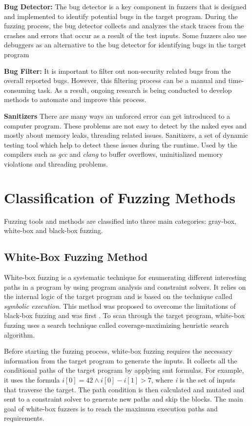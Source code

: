 \textbf{Bug Detector:} The bug detector is a key component in fuzzers that is designed
and implemented to identify potential bugs in the target program.
During the fuzzing process, the bug detector collects and analyzes the stack
traces from the crashes and errors that occur as a result of the test inputs.
Some fuzzers also use debuggers as an alternative to the bug detector for
identifying bugs in the target program

\textbf{Bug Filter:} It is important to filter out non-security related bugs
from the overall reported bugs. However, this filtering process can be a manual and
time-consuming task. As a result, ongoing research is being conducted to develop
methods to automate and improve this process.

\textbf{Sanitizers}
There are many ways an unforced error can get introduced to a computer program. These problems are not
easy to detect by the naked eyes and mostly about memory leaks, threading related issues. Sanitizers, a set
of dynamic testing tool which help to detect these issues during the runtime. Used by the
compilers such as \textit{gcc} and \textit{clang} to buffer overflows, uninitialized memory violations
and threading problems.

\section{Classification of Fuzzing Methods}\label{sec:fuzzing_methods}
Fuzzing tools and methods are classified into three main categories: gray-box, white-box and
black-box fuzzing.

\subsection{White-Box Fuzzing Method}

White-box fuzzing is a systematic technique for enumerating different interesting paths in a
program by using program analysis and constraint solvers. It relies on the internal logic
of the target program and is based on the technique called \textit{symbolic execution}\cite{cadar2013symbolic}.
This method was proposed to overcome the limitations of black-box fuzzing and was first
. To scan through the target program, white-box fuzzing uses
a search technique called coverage-maximizing heuristic search
algorithm\cite{godefroid2008automated}\cite{liang2018fuzzing}.

Before starting the fuzzing process, white-box fuzzing requires the necessary information
from the target program to generate the inputs. It collects all the conditional paths of the target
program by applying \acrlong{smt} formulas. For example, it uses the formula
\begin{math}i[0] = 42 \land i[0] - i[1] > 7\end{math}, where \textit{i} is the set of inputs
that traverse the target\cite{bohme2021fuzzing}. The path condition is then calculated and mutated
and sent to a constraint solver to generate new paths and skip the blocks.
The main goal of white-box fuzzers is to reach the maximum execution paths and requirements.


